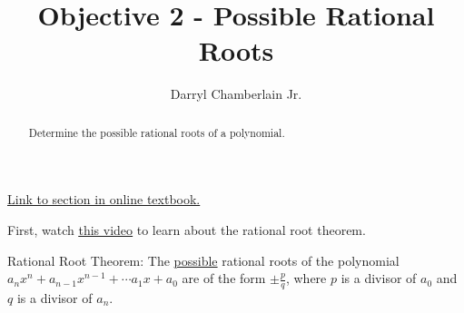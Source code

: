 \documentclass{ximera}
\author{Darryl Chamberlain Jr.}
\title{Objective 2 - Possible Rational Roots}
\begin{document}
\begin{abstract}
Determine the possible rational roots of a polynomial.
\end{abstract}
\maketitle
 
\href{https://cnx.org/contents/mwjClAV_@8.1:G7V9LHif@17/Zeros-of-Polynomial-Functions}{Link to section in online textbook.}
 
 
First, watch
\underline{\href{https://mediasite.video.ufl.edu/Mediasite/Play/53ddb4ecf01e431ca5590036addef90b1d}{this video}} to learn about the rational root theorem.
 
\begin{theorem}
Rational Root Theorem: The \underline{possible} rational roots of the polynomial $a_n x^n + a_{n-1} x^{n-1} + \cdots a_1 x + a_0$ are of the form $\pm \frac{p}{q}$, where $p$ is a divisor of $a_0$ and $q$ is a divisor of $a_n$.
\end{theorem}
 
\end{document}
